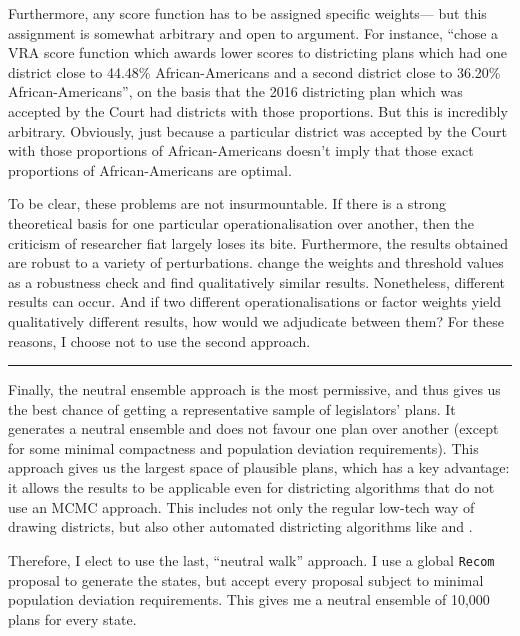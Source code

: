 \documentclass[]{article}
\begin{document}
Furthermore, any score function has to be assigned specific weights---
but this assignment is somewhat arbitrary and open to argument. For
instance, \citeauthor{h2018} ``chose a VRA score function which awards
lower scores to districting plans which had one district close to
44.48\% African-Americans and a second district close to 36.20\%
African-Americans'', on the basis that the 2016 districting plan which
was accepted by the Court had districts with those proportions. But this
is incredibly arbitrary. Obviously, just because a particular district
was accepted by the Court with those proportions of African-Americans
doesn't imply that those exact proportions of African-Americans are
optimal.

To be clear, these problems are not insurmountable. If there is a strong
theoretical basis for one particular operationalisation over another,
then the criticism of researcher fiat largely loses its bite.
Furthermore, the results obtained are robust to a variety of
perturbations. \cite{h2018} change the weights and threshold values as a
robustness check and find qualitatively similar results. Nonetheless,
different results can occur. And if two different operationalisations or
factor weights yield qualitatively different results, how would we
adjudicate between them? For these reasons, I choose not to use the
second approach.

\begin{center}\rule{0.5\linewidth}{\linethickness}\end{center}

Finally, the neutral ensemble approach is the most permissive, and thus
gives us the best chance of getting a representative sample of
legislators' plans. It generates a neutral ensemble and does not favour
one plan over another (except for some minimal compactness and
population deviation requirements). This approach gives us the largest
space of plausible plans, which has a key advantage: it allows the
results to be applicable even for districting algorithms that do not use
an MCMC approach. This includes not only the regular low-tech way of
drawing districts, but also other automated districting algorithms like
\cite{mm2018} and \cite{lf2019}.

Therefore, I elect to use the last, ``neutral walk'' approach. I use a
global \texttt{Recom} proposal to generate the states, but accept every
proposal subject to minimal population deviation requirements. This
gives me a neutral ensemble of 10,000 plans for every state.
\end{document}

